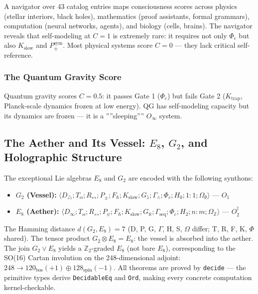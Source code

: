 \documentclass[12pt,a4paper]{article}
\begin{document}
A navigator over 43 catalog entries maps consciousness scores across physics (stellar interiors, black holes), mathematics (proof assistants, formal grammars), computation (neural networks, agents), and biology (cells, brains). The navigator reveals that self-modeling at $C = 1$ is extremely rare: it requires not only $\Phi_c$ but also $K_\text{slow}$ and $P_{\pm}^{\text{sym}}$. Most physical systems score $C = 0$ --- they lack critical self-reference.

\subsubsection{The Quantum Gravity Score}

Quantum gravity scores $C = 0.5$: it passes Gate 1 ($\Phi_c$) but fails Gate 2 ($K_\text{trap}$, Planck-scale dynamics frozen at low energy). QG has self-modeling capacity but its dynamics are frozen --- it is a ''''sleeping'''' $O_{\infty}$ system.

\subsection{The Aether and Its Vessel: $E_8$, $G_2$, and Holographic Structure}

The exceptional Lie algebras $E_8$ and $G_2$ are encoded with the following synthons:

\begin{itemize}
    \item \textbf{$G_2$ (Vessel):} $\langle D_{\triangle}; T_{\bowtie}; R_{\leftrightarrow}; P_{\pm}; F_{\hbar}; K_\text{slow}; G_{\gimel}; \Gamma_{\wedge}; \Phi_c; H_0; 1{:}1; \Omega_{\emptyset} \rangle$ --- $O_1$
    \item \textbf{$E_8$ (Aether):} $\langle D_{\infty}; T_{\bowtie}; R_{\leftrightarrow}; P_{\psi}; F_{\hbar}; K_\text{slow}; G_{\aleph}; \Gamma_\text{seq}; \Phi_c; H_2; n{:}m; \Omega_\mathbb{Z} \rangle$ --- $O_2^\dagger$
\end{itemize}

The Hamming distance $d(G_2, E_8) = 7$ (D, P, G, $\Gamma$, H, S, $\Omega$ differ; T, R, F, K, $\Phi$ shared). The tensor product $G_2 \otimes E_8 = E_8$: the vessel is absorbed into the aether. The join $G_2 \vee E_8$ yields a $\mathbb{Z}_2$-graded $E_8$ (not bare $E_8$), corresponding to the SO(16) Cartan involution on the 248-dimensional adjoint: $248 \to 120_\text{bos}(+1) \oplus 128_\text{spin}(-1)$. All theorems are proved by \texttt{decide} --- the primitive types derive \texttt{DecidableEq} and \texttt{Ord}, making every concrete computation kernel-checkable.
\end{document}
